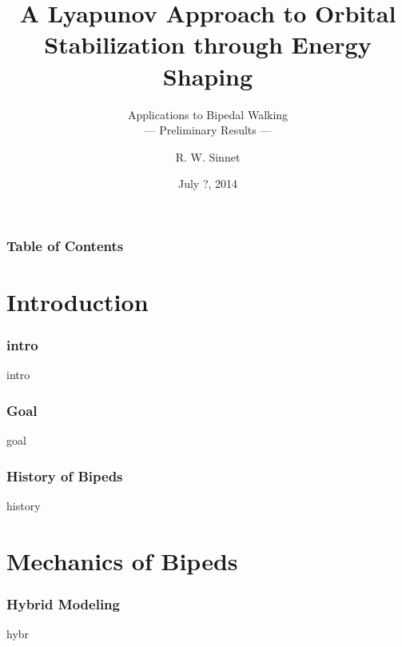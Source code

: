 \documentclass{beamer}
\title[Energy Shaping]{A Lyapunov Approach to Orbital \\Stabilization through Energy Shaping}
\subtitle{Applications to Bipedal Walking\\--- Preliminary Results ---}
\author{R. W. Sinnet}
\institute{Department of Mechanical Engineering\\ Texas A\&M University}
\date{July ?, 2014}
\begin{document}
\frame{\titlepage}

\begin{frame}
  \frametitle{Table of Contents}
  \tableofcontents
\end{frame}

\section{Introduction}
\begin{frame}
  \frametitle{intro}
  intro
\end{frame}

\begin{frame}
  \frametitle{Goal}
  goal
\end{frame}

\begin{frame}
  \frametitle{History of Bipeds}
  history
\end{frame}

\section{Mechanics of Bipeds}
\begin{frame}
  \frametitle{Hybrid Modeling}
  hybr
\end{frame}
\end{document}
